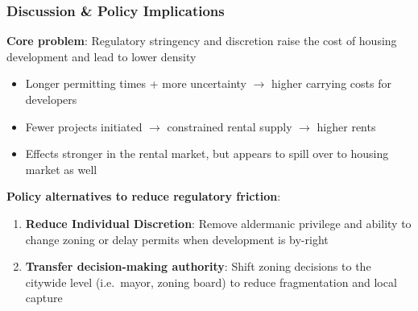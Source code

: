 
\begin{frame}
    \frametitle{Discussion \& Policy Implications}
    
    \textbf{Core problem}: Regulatory stringency and discretion raise the cost of housing development and lead to lower density
    \begin{itemize}
        \item Longer permitting times + more uncertainty $\rightarrow$ higher carrying costs for developers
        \item Fewer projects initiated $\rightarrow$ constrained rental supply $\rightarrow$ higher rents
        \item Effects stronger in the rental market, but appears to spill over to housing market as well
    \end{itemize}

    \vspace{0.5em}
    \textbf{Policy alternatives to reduce regulatory friction}:
    \begin{enumerate}
        \item \textbf{Reduce Individual Discretion}: Remove aldermanic privilege and ability to change zoning or delay permits when development is by-right
        \item \textbf{Transfer decision-making authority}: Shift zoning decisions to the citywide level (i.e.\ mayor, zoning board) to reduce fragmentation and local capture
    \end{enumerate}
\end{frame}

